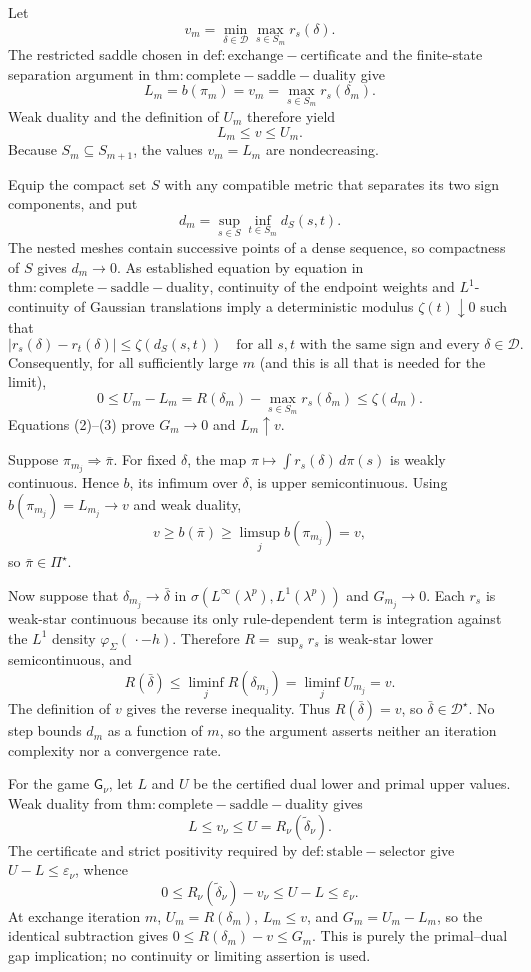 Let
\[
 v_m=\min_{\delta\in\mathcal D}\max_{s\in S_m}r_s(\delta).
\]
The restricted saddle chosen in \(\mathrm{def:exchange-certificate}\) and the finite-state separation argument in \(\mathrm{thm:complete-saddle-duality}\) give
\[
 L_m=b(\pi_m)=v_m=\max_{s\in S_m}r_s(\delta_m). \tag{1}
\]
Weak duality and the definition of \(U_m\) therefore yield
\[
 L_m\leq v\leq U_m. \tag{2}
\]
Because \(S_m\subseteq S_{m+1}\), the values \(v_m=L_m\) are nondecreasing.

Equip the compact set \(S\) with any compatible metric that separates its two sign components, and put
\[
 d_m=\sup_{s\in S}\inf_{t\in S_m}d_S(s,t).
\]
The nested meshes contain successive points of a dense sequence, so compactness of \(S\) gives \(d_m\to0\). As established equation by equation in \(\mathrm{thm:complete-saddle-duality}\), continuity of the endpoint weights and \(L^1\)-continuity of Gaussian translations imply a deterministic modulus \(\zeta(t)\downarrow0\) such that
\[
 |r_s(\delta)-r_t(\delta)|\leq\zeta(d_S(s,t))
 \quad\text{for all }s,t\text{ with the same sign and every }\delta\in\mathcal D.
\]
Consequently, for all sufficiently large \(m\) (and this is all that is needed for the limit),
\[
 0\leq U_m-L_m
 =R(\delta_m)-\max_{s\in S_m}r_s(\delta_m)
 \leq\zeta(d_m). \tag{3}
\]
Equations (2)--(3) prove \(G_m\to0\) and \(L_m\uparrow v\).

Suppose \(\pi_{m_j}\Rightarrow\bar\pi\). For fixed \(\delta\), the map \(\pi\mapsto\int r_s(\delta)\,d\pi(s)\) is weakly continuous. Hence \(b\), its infimum over \(\delta\), is upper semicontinuous. Using \(b(\pi_{m_j})=L_{m_j}\to v\) and weak duality,
\[
 v\geq b(\bar\pi)\geq\limsup_j b(\pi_{m_j})=v,
\]
so \(\bar\pi\in\Pi^{\star}\).

Now suppose that \(\delta_{m_j}\to\bar\delta\) in \(\sigma(L^{\infty}(\lambda^p),L^1(\lambda^p))\) and \(G_{m_j}\to0\). Each \(r_s\) is weak-star continuous because its only rule-dependent term is integration against the \(L^1\) density \(\varphi_{\Sigma}(\,\cdot-h)\). Therefore \(R=\sup_s r_s\) is weak-star lower semicontinuous, and
\[
 R(\bar\delta)\leq\liminf_jR(\delta_{m_j})
 =\liminf_jU_{m_j}=v.
\]
The definition of \(v\) gives the reverse inequality. Thus \(R(\bar\delta)=v\), so \(\bar\delta\in\mathcal D^{\star}\). No step bounds \(d_m\) as a function of \(m\), so the argument asserts neither an iteration complexity nor a convergence rate.

For the game \(\mathsf G_{\nu}\), let \(L\) and \(U\) be the certified dual lower and primal upper values. Weak duality from \(\mathrm{thm:complete-saddle-duality}\) gives
\[
 L\leq v_{\nu}\leq U=R_{\nu}(\widetilde\delta_{\nu}).
\]
The certificate and strict positivity required by \(\mathrm{def:stable-selector}\) give \(U-L\leq\varepsilon_{\nu}\), whence
\[
 0\leq R_{\nu}(\widetilde\delta_{\nu})-v_{\nu}
 \leq U-L\leq\varepsilon_{\nu}.
\]
At exchange iteration \(m\), \(U_m=R(\delta_m)\), \(L_m\leq v\), and \(G_m=U_m-L_m\), so the identical subtraction gives \(0\leq R(\delta_m)-v\leq G_m\). This is purely the primal--dual gap implication; no continuity or limiting assertion is used.

